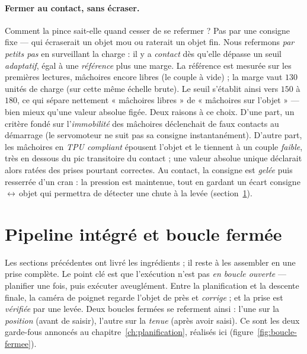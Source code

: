 \paragraph{Fermer au contact, sans écraser.} Comment la pince sait-elle quand cesser de se refermer ? Pas par une consigne fixe --- qui écraserait un objet mou ou raterait un objet fin. Nous refermons \emph{par petits pas} en surveillant la charge : il y a \emph{contact} dès qu'elle dépasse un seuil \emph{adaptatif}, égal à une \emph{référence} plus une marge. La référence est mesurée sur les premières lectures, mâchoires encore libres (le couple à vide) ; la marge vaut $130$ unités de charge (sur cette même échelle brute). Le seuil s'établit ainsi vers $150$ à $180$, ce qui sépare nettement « mâchoires libres » de « mâchoires sur l'objet » --- bien mieux qu'une valeur absolue figée. Deux raisons à ce choix. D'une part, un critère fondé sur l'\emph{immobilité} des mâchoires déclenchait de faux contacts au démarrage (le servomoteur ne suit pas sa consigne instantanément). D'autre part, les mâchoires en \emph{TPU compliant} épousent l'objet et le tiennent à un couple \emph{faible}, très en dessous du pic transitoire du contact ; une valeur absolue unique déclarait alors ratées des prises pourtant correctes. Au contact, la consigne est \emph{gelée} puis resserrée d'un cran : la pression est maintenue, tout en gardant un écart consigne\,$\leftrightarrow$\,objet qui permettra de détecter une chute à la levée (section~\ref{sec:boucle-fermee}).


\section{Pipeline intégré et boucle fermée}
\label{sec:boucle-fermee}

Les sections précédentes ont livré les ingrédients ; il reste à les assembler en une prise complète. Le point clé est que l'exécution n'est pas \emph{en boucle ouverte} --- planifier une fois, puis exécuter aveuglément. Entre la planification et la descente finale, la caméra de poignet regarde l'objet de près et \emph{corrige} ; et la prise est \emph{vérifiée} par une levée. Deux boucles fermées se referment ainsi : l'une sur la \emph{position} (avant de saisir), l'autre sur la \emph{tenue} (après avoir saisi). Ce sont les deux garde-fous annoncés au chapitre~\ref{ch:planification}, réalisés ici (figure~\ref{fig:boucle-fermee}).

